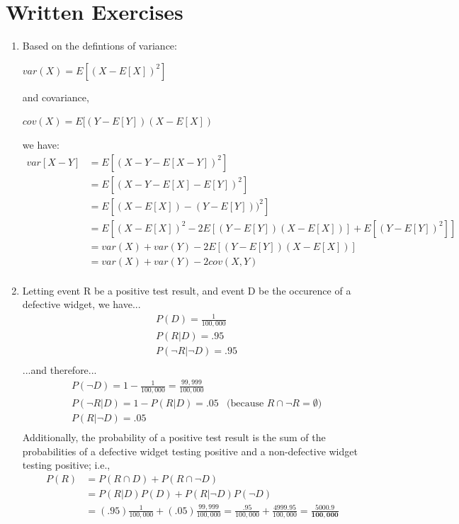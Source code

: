 \documentclass{report}
\begin{document}
\section*{Written Exercises}	
\begin{enumerate}
	\item Based on the defintions of variance:\\
	\centerline{$var(X) = E[(X - E[X])^2]$}
	and covariance,\\
	\centerline{$cov(X) = E[(Y - E[Y])(X - E[X])$}
	we have:
	\begin{align*}
    var[X-Y] &= E[( X - Y - E[X - Y])^2]  \\
    	 	 &= E[( X - Y - E[X] - E[Y])^2] \\
    	 	 &= E[( X - E[X]) - (Y - E[Y]) )^2] \\
    	 	 &= E[( X - E[X])^2 - 2E[(Y - E[Y])(X - E[X])] + E[(Y - E[Y])^2]] \\
    	 	 &= var(X) + var(Y) - 2E[(Y - E[Y])(X - E[X])] \\
    	 	 &= var(X) + var(Y) - 2cov(X,Y ) \\
    \end{align*}
	\item Letting event R be a positive test result, and event D be the occurence of a defective widget, we have...
	\begin{align*}
	     & P(D) = \frac{1}{100,000} \\
	     & P(R \vert D) = .95  \\
	     & P(\lnot R \vert \lnot D) = .95 \\
	 \end{align*}
	    ...and therefore...
	    \begin{align*}
	     & P(\lnot D) 				= 1 - \frac{1}{100,000} = \frac{99,999}{100,000} \\
	     & P(\lnot R \vert 		D) 	= 1-  P(R \vert D) =.05  & 
	     \text{(because $R \cap \lnot R = \emptyset$)}\\
	     & P(R 		\vert \lnot D) 	= .05  \\
	 	\end{align*}
	 	Additionally, the probability of a positive test result is the sum of the probabilities of a  defective widget testing positive and a non-defective widget testing positive; i.e.,
	 	\begin{align*}
	 	 P(R) 	&= P(R \cap D) + P(R \cap \lnot D)\\
	 	 		&= P(R \vert D)P(D) + P(R \vert \lnot D)P(\lnot D) \\
	 	 		&= (.95)\frac{1}{100,000} + (.05)\frac{99,999}{100,000} 
	 	 		 = \frac{.95}{100,000} + \frac{4999.95}{100,000} 
	 	 		 = \mathbf{\frac{5000.9}{100,000}}\\
	    \end{align*}
	    

\end{enumerate}
\end{document}
